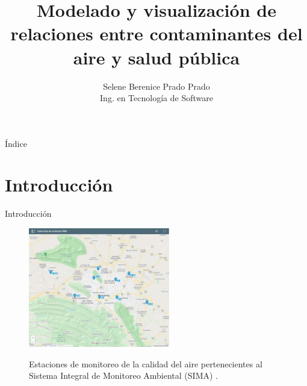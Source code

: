 \documentclass[11pt]{beamer}
\begin{document}
\title[Defensa de Tesis  \hspace{35mm} \insertframenumber/\inserttotalframenumber]{Modelado y visualización de relaciones entre contaminantes del aire y salud pública}
\centering {}
\author{Selene Berenice Prado Prado \\ Ing. en Tecnología de Software}
\begin{frame}
\begin{center}
\end{center}
\vspace{-1cm}
\titlepage
\end{frame}

\begin{frame}{Índice}
\transdissolve
\begin{center}
\begin{multicols}{2}
  \footnotesize{\tableofcontents}	
\end{multicols}
\end{center}
\end{frame}


\section{Introducción}

\begin{frame}{Introducción}
\begin{figure}[!h]
    \centering
	\includegraphics[trim=50 50 50 50,clip,width=0.55\textwidth]{mapa_estaciones}
	\label{fig:estaciones}
	\caption{Estaciones de monitoreo de la calidad del aire pertenecientes al Sistema Integral de Monitoreo Ambiental (SIMA) \cite{f2}.}
	\end{figure}
\end{frame}
\end{document}
